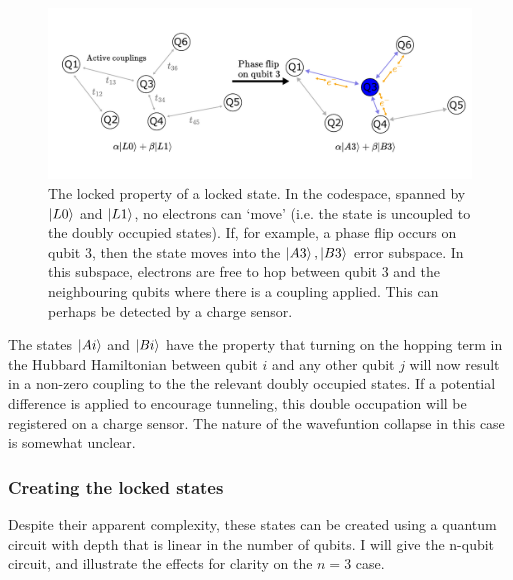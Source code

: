 \documentclass{report}
\begin{document}
\begin{appendices}
\begin{figure}[h]
    \centering
    \includegraphics[scale = 0.8]{Figures/locked_states.pdf}
    \caption{The locked property of a locked state. In the codespace, spanned by $\ket{L0}$ and $\ket{L1}$, no electrons can `move' (i.e. the state is uncoupled to the doubly occupied states). If, for example, a phase flip occurs on qubit 3, then the state moves into the $\ket{A3}, \ket{B3}$ error subspace. In this subspace, electrons are free to hop between qubit 3 and the neighbouring qubits where there is a coupling applied. This can perhaps be detected by a charge sensor.
    }\label{fig:lockedstates}
\end{figure}

The states $\ket{Ai}$ and $\ket{Bi}$ have the property that turning on the hopping term in the Hubbard Hamiltonian between qubit $i$ and any other qubit $j$ will now result in a non-zero coupling to the the relevant doubly occupied states. If a potential difference is applied to encourage tunneling, this double occupation will be registered on a charge sensor. The nature of the wavefuntion collapse in this case is somewhat unclear.
\subsubsection{Creating the locked states}
Despite their apparent complexity, these states can be created using a quantum circuit with depth that is linear in the number of qubits. I will give the n-qubit circuit, and illustrate the effects for clarity on the $n = 3$ case.


\end{appendices}
\end{document}

